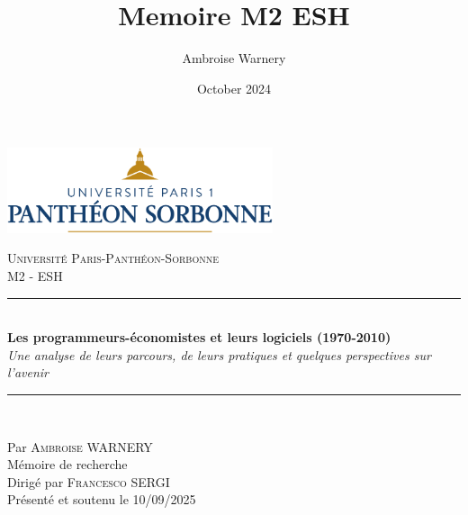 \documentclass[a4paper,12pt,twoside,french]{book}
\title{Memoire M2 ESH}
\author{Ambroise Warnery}
\date{October 2024}
\begin{document}
\begin{titlepage}
    \begin{center}
            \includegraphics[height=2.5cm]{figures/cover/logoparis1.png}
    \end{center}

    \begin{center}
    
\vspace*{.03\textheight}
\textsc{\LARGE Université Paris-Panthéon-Sorbonne}\\[0.2cm] %
    \large M2 - ESH\\
          \vfill
            \rule{\textwidth}{0.8pt} \\ %
            \vspace{10pt}
            {\LARGE \bfseries Les programmeurs-économistes et leurs logiciels (1970-2010)}\\[0.4cm] %
            {\large \itshape Une analyse de leurs parcours, de leurs pratiques et quelques perspectives sur l'avenir} %
            \vspace{10pt}
            \rule{\textwidth}{0.8pt} \\ %
    \end{center}
    
    \vfill
    \begin{center}
        Par \textsc{\Large Ambroise WARNERY}\\[1cm] 
        Mémoire de recherche\\[1.2cm]
        Dirigé par \textsc{\large Francesco SERGI}\\[0.2cm]
        Présenté et soutenu le 10/09/2025 %
    \end{center}
    
    \vspace{1cm}


\newpage %
\thispagestyle{empty} %
\end{titlepage}
\end{document}
